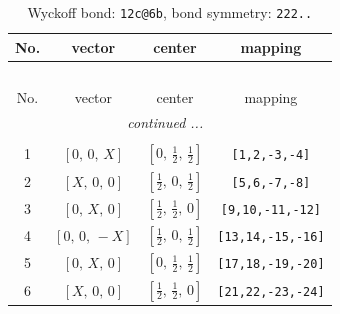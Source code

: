 \documentclass[fleqn,8pt]{jsarticle}
\begin{document}
\begin{longtable}{cccc}
\caption{Wyckoff bond: {\tt 12c@6b}, bond symmetry: {\tt 222..}}
 \\
 \hline \hline
No. & vector & center & mapping \\ \hline \endfirsthead

\multicolumn{3}{l}{\tablename\ \thetable{}} \\
 \hline \hline
No. & vector & center & mapping \\ \hline \endhead

 \hline \hline
\multicolumn{3}{r}{\footnotesize\it continued ...} \\ \endfoot

 \hline \hline
\multicolumn{3}{r}{} \\ \endlastfoot

1 & $\left[ 0,\, 0,\, X \right]$ & $\left[ 0,\, \frac{1}{2},\, \frac{1}{2} \right]$ & {\tt [1,2,-3,-4]} \\ \hline
2 & $\left[ X,\, 0,\, 0 \right]$ & $\left[ \frac{1}{2},\, 0,\, \frac{1}{2} \right]$ & {\tt [5,6,-7,-8]} \\ \hline
3 & $\left[ 0,\, X,\, 0 \right]$ & $\left[ \frac{1}{2},\, \frac{1}{2},\, 0 \right]$ & {\tt [9,10,-11,-12]} \\ \hline
4 & $\left[ 0,\, 0,\, - X \right]$ & $\left[ \frac{1}{2},\, 0,\, \frac{1}{2} \right]$ & {\tt [13,14,-15,-16]} \\ \hline
5 & $\left[ 0,\, X,\, 0 \right]$ & $\left[ 0,\, \frac{1}{2},\, \frac{1}{2} \right]$ & {\tt [17,18,-19,-20]} \\ \hline
6 & $\left[ X,\, 0,\, 0 \right]$ & $\left[ \frac{1}{2},\, \frac{1}{2},\, 0 \right]$ & {\tt [21,22,-23,-24]} \\
\end{longtable}
\renewcommand{\arraystretch}{1.2}
\end{document}

